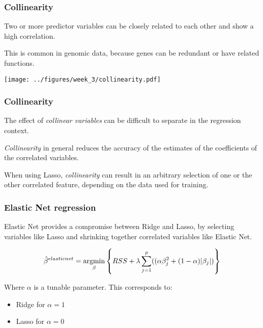 \documentclass[notes]{beamer}          %
\newcommand{\argmin}{\operatornamewithlimits{argmin}}
\begin{document}
\begin{frame}
\frametitle{Collinearity}
Two or more predictor variables can be closely related to each other and show a high correlation.

\vspace{5mm} 

This is common in genomic data, because genes can be redundant or have related functions.

\begin{center}
\texttt{[image: ../figures/week\_3/collinearity.pdf]}
\end{center}

\end{frame}

\begin{frame}
\frametitle{Collinearity}
The effect of \textit{collinear variables} can be difficult to separate in the regression context.

\vspace{5mm} 

\textit{Collinearity} in general reduces the accuracy of the estimates of the coefficients of the correlated variables.

\vspace{5mm} 

When using Lasso, \textit{collinearity} can result in an arbitrary selection of one or the other correlated feature, depending on the data used for training.
\end{frame}

\begin{frame}
\frametitle{Elastic Net regression}

Elastic Net provides a compromise between Ridge and Lasso, by selecting variables like Lasso and shrinking together correlated variables like Elastic Net.


\begin{equation*}
    \hat{\beta}^{elastic net} =  \argmin_{\beta} \left\{ RSS + \lambda \sum_{j=1}^p ((\alpha \beta_j^2 + (1-\alpha)| \beta_j |) \right\}
\end{equation*}

Where $\alpha$ is a tunable parameter. This corresponds to:

\begin{itemize}
    \item Ridge for $\alpha=1$
    \item Lasso for $\alpha=0$
\end{itemize}

\end{frame}
\end{document}
